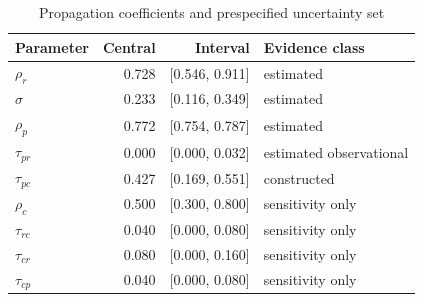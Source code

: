 \begin{table}[t]
\centering
\caption{Propagation coefficients and prespecified uncertainty set}
\label{tab:calibrated-uncertainty}
\begin{tabular}{lrrl}
\toprule
Parameter & Central & Interval & Evidence class \\
\midrule
$\rho_r$ & 0.728 & [0.546, 0.911] & estimated \\
$\sigma$ & 0.233 & [0.116, 0.349] & estimated \\
$\rho_p$ & 0.772 & [0.754, 0.787] & estimated \\
$\tau_{pr}$ & 0.000 & [0.000, 0.032] & estimated observational \\
$\tau_{pc}$ & 0.427 & [0.169, 0.551] & constructed \\
$\rho_c$ & 0.500 & [0.300, 0.800] & sensitivity only \\
$\tau_{rc}$ & 0.040 & [0.000, 0.080] & sensitivity only \\
$\tau_{cr}$ & 0.080 & [0.000, 0.160] & sensitivity only \\
$\tau_{cp}$ & 0.040 & [0.000, 0.080] & sensitivity only \\
\bottomrule
\end{tabular}
\end{table}
